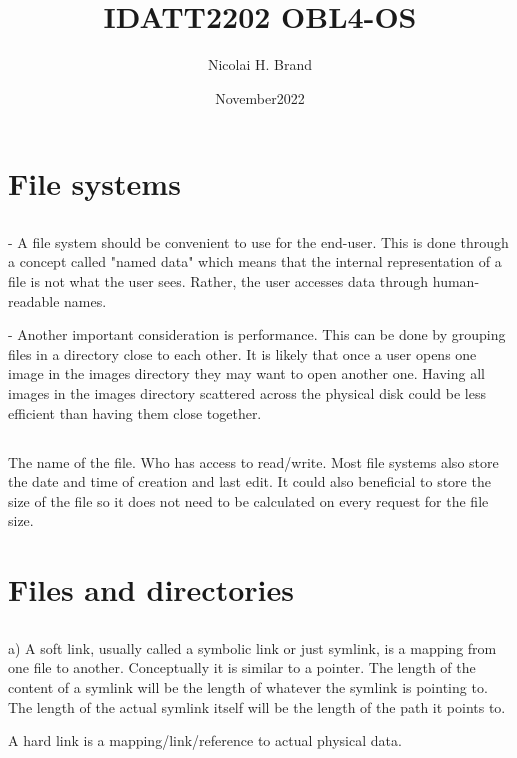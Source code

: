 \documentclass{article}
\title{IDATT2202 OBL4-OS}
\author{Nicolai H. Brand}
\date{November2022}
\begin{document}
\maketitle

\section{File systems}
\subsection{}
- A file system should be convenient to use for the end-user. This is done through a concept called "named data" which means that the internal representation of a file is not what the user sees. Rather, the user accesses data through human-readable names.

- Another important consideration is performance. This can be done by grouping files in a directory close to each other. It is likely that once a user opens one image in the images directory they may want to open another one. Having all images in the images directory scattered across the physical disk could be less efficient than having them close together.

\subsection{}

The name of the file. Who has access to read/write. Most file systems also store the date and time of creation and last edit. It could also beneficial to store the size of the file so it does not need to be calculated on every request for the file size.

\section{Files and directories}
\subsection{}
a) A soft link, usually called a symbolic link or just symlink, is a mapping from one file to another. Conceptually it is similar to a pointer. The length of the content of a symlink will be the length of whatever the symlink is pointing to. The length of the actual symlink itself will be the length of the path it points to.

A hard link is a mapping/link/reference to actual physical data.
\end{document}
